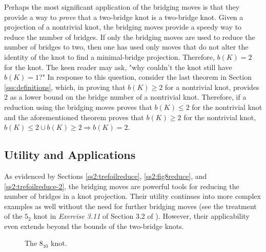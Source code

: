 \documentclass[titlepage,11pt]{article}
\begin{document}
Perhaps the most significant application of the bridging moves is that they provide a way to \emph{prove} that a two-bridge knot is a two-bridge knot. Given a projection of a nontrivial knot, the bridging moves provide a speedy way to reduce the number of bridges. If only the bridging moves are used to reduce the number of bridges to two, then one has used only moves that do not alter the identity of the knot to find a minimal-bridge projection. Therefore, $b(K)=2$ for the knot. The keen reader may ask, "why couldn't the knot still have $b(K)=1$?" In response to this question, consider the last theorem in Section \ref{sss:definitions}, which, in proving that $b(K)\geq 2$ for a nontrivial knot, provides 2 as a lower bound on the bridge number of a nontrivial knot. Therefore, if a reduction using the bridging moves proves that $b(K)\leq 2$ for the nontrivial knot and the aforementioned theorem proves that $b(K)\geq 2$ for the nontrivial knot, $b(K)\leq 2 \cup b(K)\geq 2\Rightarrow b(K)=2$.


\subsection{Utility and Applications}\label{sss:utility}
As evidenced by Sections \ref{ss2:trefoilreduce}, \ref{ss2:fig8reduce}, and \ref{ss2:trefoilreduce-2}, the bridging moves are powerful tools for reducing the number of bridges in a knot projection. Their utility continues into more complex examples as well without the need for further bridging moves (see the treatment of the $5_2$ knot in \emph{Exercise 3.11} of Section 3.2 of \cite{bib:knotnotes}). However, their applicability even extends beyond the bounds of the two-bridge knots.\par

\begin{figure}[h!]
    \centering
    \vspace{-1.5em}
    \caption{The $8_{10}$ knot.}
    \label{fig:810}
\end{figure}
\end{document}
